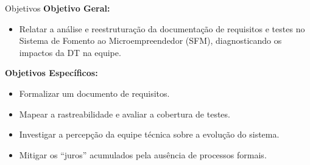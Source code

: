 \begin{frame}{Objetivos}
  \textbf{Objetivo Geral:}
  \begin{itemize}
    \item Relatar a análise e reestruturação da documentação de requisitos e testes no Sistema de Fomento ao Microempreendedor (SFM), diagnosticando os impactos da DT na equipe.
  \end{itemize}
  
  \vspace{1em}
  
  \textbf{Objetivos Específicos:}
  \begin{itemize}
    \item Formalizar um documento de requisitos.
    \item Mapear a rastreabilidade e avaliar a cobertura de testes.
    \item Investigar a percepção da equipe técnica sobre a evolução do sistema.
    \item Mitigar os ``juros'' acumulados pela ausência de processos formais.
  \end{itemize}
\end{frame}
